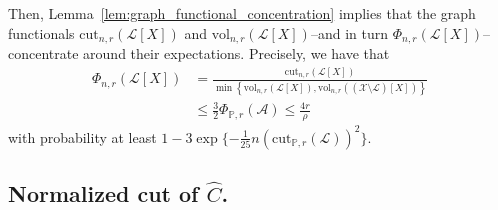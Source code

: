 \documentclass[11pt,twoside]{article}
\theoremstyle{definition}
\newcommand{\set}[1]{\left\{#1\right\}}
\newcommand{\vol}{\mathrm{vol}}
\newcommand{\cut}{\mathrm{cut}}
\newcommand{\1}{\mathbbm{1}}
\newcommand{\Xbf}{X}
\newcommand{\Pbb}{\mathbb{P}}
\newcommand{\Aset}{\mathcal{A}}
\newcommand{\Cest}{\widehat{C}}
\begin{document}
Then, Lemma~\ref{lem:graph_functional_concentration} implies that the graph functionals $\cut_{n,r}(\mathcal{L}[\Xbf])$ and $\vol_{n,r}(\mathcal{L}[\Xbf])$--and in turn $\Phi_{n,r}(\mathcal{L}[\Xbf])$-- concentrate around their expectations. Precisely, we have that 
\begin{align}
\Phi_{n,r}(\mathcal{L}[\Xbf]) & = \frac{\cut_{n,r}(\mathcal{L}[\Xbf])}{\min\set{\vol_{n,r}(\mathcal{L}[\Xbf]),\vol_{n,r}((\mathcal{X}\setminus\mathcal{L})[\Xbf])}} \nonumber \\
& \leq \frac{3}{2}\Phi_{\Pbb,r}(\Aset) \leq \frac{4 r}{\rho} \label{eqn:lb_pf2}
\end{align}
with probability at least $1 - 3\exp\{-\frac{1}{25}n(\cut_{\Pbb,r}(\mathcal{L}))^2\}$. 

\subsection{Normalized cut of $\Cest$.}
\end{document}
